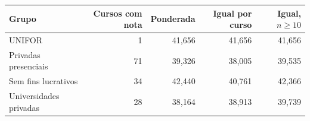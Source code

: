 \begin{tabular}{lrrrr}
\toprule
Grupo & Cursos com nota & Ponderada & Igual por curso & Igual, $n\geq10$ \\
\midrule
UNIFOR & 1 & 41,656 & 41,656 & 41,656 \\
Privadas presenciais & 71 & 39,326 & 38,005 & 39,535 \\
Sem fins lucrativos & 34 & 42,440 & 40,761 & 42,366 \\
Universidades privadas & 28 & 38,164 & 38,913 & 39,739 \\
\bottomrule
\end{tabular}

